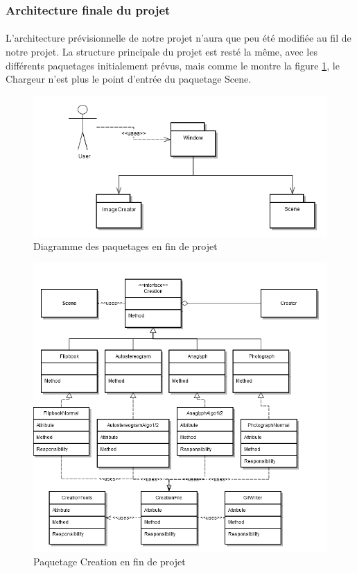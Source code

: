 \subsubsection{Architecture finale du projet}
\paragraph{}
L'architecture prévisionnelle de notre projet n'aura que peu été modifiée au fil de notre projet. La structure principale du projet est resté la même, avec les différents paquetages initialement prévus, mais comme le montre la figure \ref{fig:archi}, le Chargeur n'est plus le point d'entrée du paquetage Scene.

\begin{figure}[h]
		\centering
        \includegraphics[scale=0.5]{paquetages.png}
		\caption{\label{fig:archi} Diagramme des paquetages en fin de projet \protect \footnotemark}
\end{figure}

\begin{figure}[h]
		\centering
		\includegraphics[scale=0.5]{f_creation.png}
		\caption{\label{fig:creation} Paquetage Creation en fin de projet \protect \footnotemark}
\end{figure}

